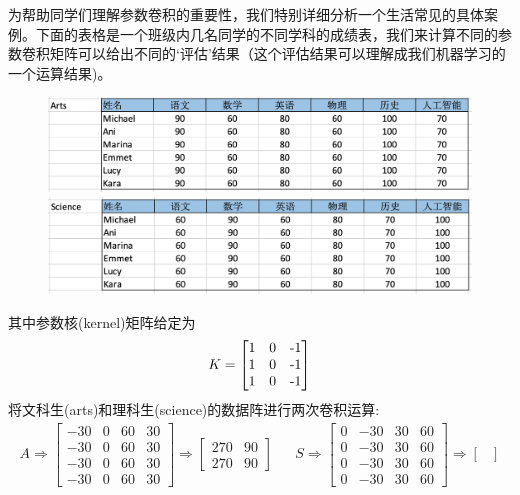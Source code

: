 \documentclass[12pt]{article}
\numberwithin{equation}{section}
\numberwithin{figure}{section}
\begin{document}
\begin{example}
为帮助同学们理解参数卷积的重要性，我们特别详细分析一个生活常见的具体案例。下面的表格是一个班级内几名同学的不同学科的成绩表，我们来计算不同的参数卷积矩阵可以给出不同的`评估'结果（这个评估结果可以理解成我们机器学习的一个运算结果)。
\begin{figure}[H]
	\centering
	\includegraphics[width=\textwidth]{fig/artsgrade}
	\includegraphics[width=\textwidth]{fig/sciencegrade}
\end{figure}
其中参数核(kernel)矩阵给定为
\begin{align*}
	K = \begin{bmatrix}
		1 & 0 & $-$1$$ \\
		1 & 0 & $-$1$$  \\
		1 & 0 & $-$1$$  
	\end{bmatrix}
\end{align*}
将文科生(arts)和理科生(science)的数据阵进行两次卷积运算:
\begin{align*}
	A \Rightarrow \begin{bmatrix}
		-30 &    0  &   60  &    30 \\
       -30  &     0  &    60  &    30   \\        
       -30  &     0  &    60  &   30 \\
       -30  &    0  &    60  &   30 
	\end{bmatrix} \Rightarrow \begin{bmatrix}
		270 & 90 \\
		270 & 90 
	\end{bmatrix} & & 	S \Rightarrow \begin{bmatrix}
	   0 & -30 & 30 & 60 \\
       0 & -30 &  30 & 60 \\
        0 & -30 &  30 & 60 \\
       0 & -30 &  30 &  60
	\end{bmatrix} \Rightarrow \begin{bmatrix}

\end{bmatrix}
\end{align*}
\end{example}
\end{document}
